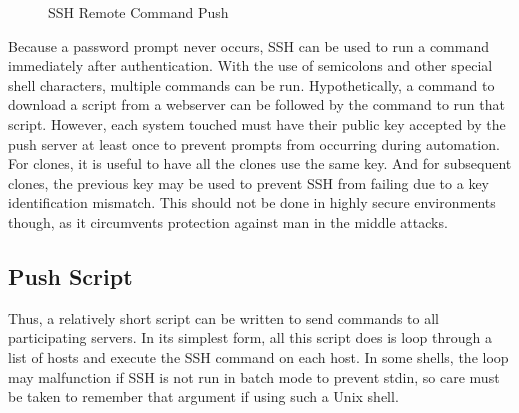 \begin{figure}
  \begin{center}
  \end{center}
  \caption{SSH Remote Command Push}
  \label{fig:sshpush}
\end{figure}

Because a password prompt never occurs, SSH can be used to run a command immediately after authentication.  With the use of semicolons and other special shell characters, multiple commands can be run.  Hypothetically, a command to download a script from a webserver can be followed by the command to run that script.  However, each system touched must have their public key accepted by the push server at least once to prevent prompts from occurring during automation.  For clones, it is useful to have all the clones use the same key.  And for subsequent clones, the previous key may be used to prevent SSH from failing due to a key identification mismatch.  This should not be done in highly secure environments though, as it circumvents protection against man in the middle attacks.  

\subsection{Push Script}
Thus, a relatively short script can be written to send commands to all participating servers.  In its simplest form, all this script does is loop through a list of hosts and execute the SSH command on each host.  In some shells, the loop may malfunction if SSH is not run in batch mode to prevent stdin, so care must be taken to remember that argument if using such a Unix shell.  

